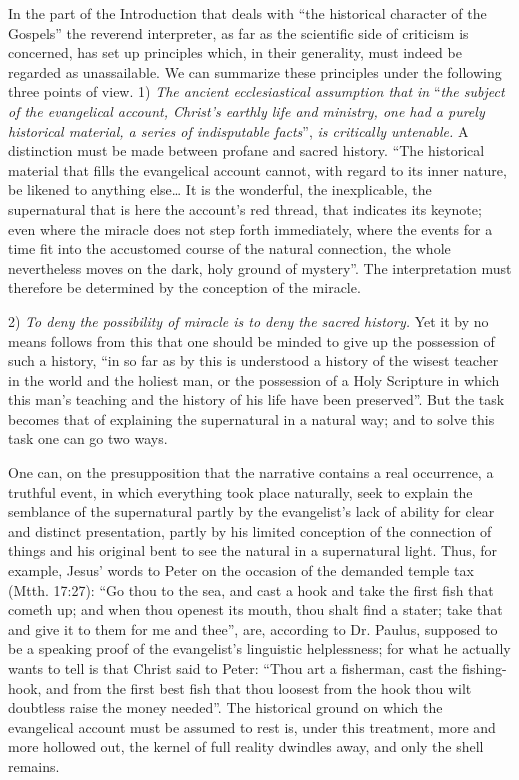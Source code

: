 \documentclass[12pt,a4paper,openany]{book}
\newcommand{\opage}[1]{\marginnote{\footnotesize\textit{[#1]}}}
\begin{document}
In the part of the Introduction that deals with ``the
historical character of the Gospels'' the reverend interpreter,
as far as the scientific side of criticism is concerned, has set up
principles which, in their generality, must indeed
be regarded as unassailable. We can summarize
these principles under the following three points of view. 1) \emph{The ancient ecclesiastical assumption that in}
``\emph{the subject of the evangelical account,
Christ's earthly life and ministry, one had a
purely historical material, a series of indisputable
facts}'', \emph{is critically untenable.}
A distinction must be made between profane and sacred history.
``The historical material that fills the evangelical account
cannot, with regard to its inner nature,
be likened to anything else\dots{} It is the wonderful, the
inexplicable, the supernatural that is here the account's
red thread, that indicates its keynote; even where
the miracle does not step forth immediately, where the events
for a time fit into the accustomed course of the
natural connection, the whole nevertheless moves on the dark,
holy ground of mystery''. The interpretation must therefore be determined
by the conception of the miracle.

2) \emph{To deny the possibility of miracle is to deny
the sacred history.} Yet it by no means follows from this
that one should be minded to
\setcounter{footnote}{0}%
\opage{292}give up the possession of such a history, ``in so far as
by this is understood a history of the wisest teacher in the world
and the holiest man, or the possession of a Holy Scripture
in which this man's teaching and the history of his life have been
preserved''. But the task becomes that of explaining the
supernatural in a natural way; and to solve this
task one can go two ways.

One can, on the presupposition that the narrative
contains a real occurrence, a truthful event,
in which everything took place naturally, seek to explain
the semblance of the supernatural partly by the evangelist's
lack of ability for clear and distinct presentation, partly
by his limited conception of the connection of things
and his original bent to see the natural
in a supernatural light. Thus, for example, Jesus' words to
Peter on the occasion of the demanded temple tax (Mtth.
17:27): ``Go thou to the sea, and cast a hook and take the
first fish that cometh up; and when thou openest its
mouth, thou shalt find a stater; take that and give it to them
for me and thee'', are, according to Dr. Paulus, supposed to be a speaking
proof of the evangelist's linguistic helplessness; for
what he actually wants to tell is that Christ said to
Peter: ``Thou art a fisherman, cast the fishing-hook, and from the
first best fish that thou loosest from the hook thou wilt
doubtless raise the money needed''. The historical
ground on which the evangelical account must be assumed
to rest is, under this treatment, more and more hollowed out,
the kernel of full reality dwindles away,
and only the shell remains.
\end{document}
